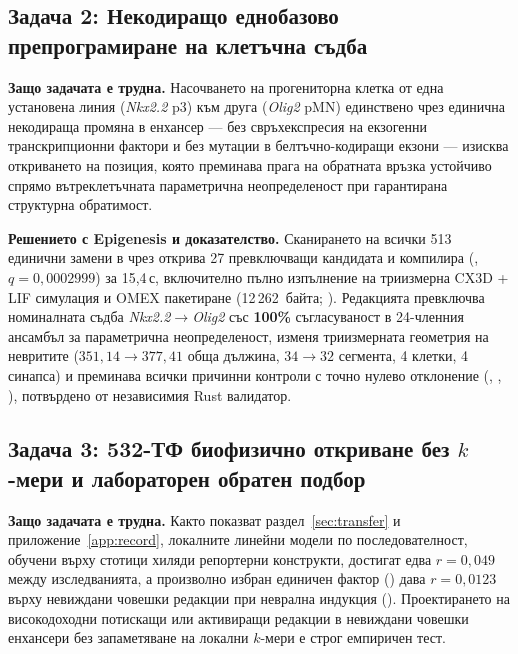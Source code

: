 \documentclass[10.5pt,a4paper]{article}
\begin{document}
\subsection{Задача 2: Некодиращо еднобазово препрограмиране на клетъчна съдба}

\textbf{Защо задачата е трудна.} Насочването на прогениторна клетка от една установена линия (\emph{Nkx2.2} p3) към друга (\emph{Olig2} pMN) единствено чрез единична некодираща промяна в енхансер — без свръхекспресия на екзогенни транскрипционни фактори и без мутации в белтъчно-кодиращи екзони — изисква откриването на позиция, която преминава прага на обратната връзка устойчиво спрямо вътреклетъчната параметрична неопределеност при гарантирана структурна обратимост.

\textbf{Решението с Epigenesis и доказателство.} Сканирането на всички 513 единични замени в  чрез  открива 27 превключващи кандидата и компилира \textbf{} (, $q=0{,}0002999$) за 15,4\,с, включително пълно изпълнение на триизмерна CX3D + LIF симулация и OMEX пакетиране (12\,262~байта;  ). Редакцията превключва номиналната съдба \emph{Nkx2.2}$\rightarrow$\emph{Olig2} със \textbf{100\%} съгласуваност в 24-членния ансамбъл за параметрична неопределеност, изменя триизмерната геометрия на невритите ($351{,}14\to 377{,}41$ обща дължина, $34\to 32$ сегмента, 4 клетки, 4 синапса) и преминава всички причинни контроли с точно нулево отклонение (, , ), потвърдено от независимия Rust валидатор.

\subsection{Задача 3: 532-ТФ биофизично откриване без $k$-мери и лабораторен обратен подбор}

\textbf{Защо задачата е трудна.} Както показват раздел~\ref{sec:transfer} и приложение~\ref{app:record}, локалните линейни модели по последователност, обучени върху стотици хиляди репортерни конструкти, достигат едва $r=0{,}049$ между изследванията, а произволно избран единичен фактор () дава $r=0{,}0123$ върху невиждани човешки редакции при неврална индукция (). Проектирането на високодоходни потискащи или активиращи редакции в невиждани човешки енхансери без запаметяване на локални $k$-мери е строг емпиричен тест.
\end{document}
